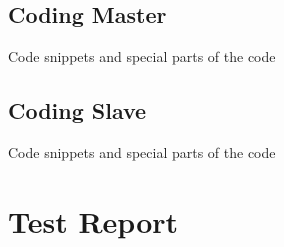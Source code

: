 \documentclass[11pt,a4paper]{article}
\begin{document}
\subsection{Coding Master}
Code snippets and special parts of the code
\subsection{Coding Slave}
Code snippets and special parts of the code
\newpage

\section{Test Report}
\newpage



\end{document}
